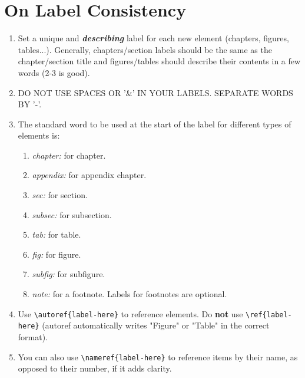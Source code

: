 \section*{On Label Consistency} \label{sec:label-consistency}
\begin{enumerate}[label=L.\arabic*]
    \item Set a unique and \textbf{\textit{describing}} label for each new element (chapters, figures, tables...). Generally, chapters/section labels should be the same as the chapter/section title and figures/tables should describe their contents in a few words (2-3 is good).
    \item DO NOT USE SPACES OR '\&' IN YOUR LABELS. SEPARATE WORDS BY '-'. 
    \item The standard word to be used at the start of the label for different types of elements is: 
    \begin{enumerate}[label*=.\arabic*]
        \item \textit{chapter:} for chapter.
        \item \textit{appendix:} for appendix chapter.
        \item \textit{sec:} for section.
        \item \textit{subsec:} for subsection.
        \item \textit{tab:} for table.
        \item \textit{fig:} for figure.
        \item \textit{subfig:} for subfigure.
        \item \textit{note:} for a footnote. Labels for footnotes are optional.
    \end{enumerate}
    \item Use \verb|\autoref{label-here}| to reference elements. Do \textbf{not} use \verb|\ref{label-here}| (autoref automatically writes "Figure" or "Table" in the correct format).
    \item You can also use \verb|\nameref{label-here}| to reference items by their name, as opposed to their number, if it adds clarity.
\end{enumerate}

